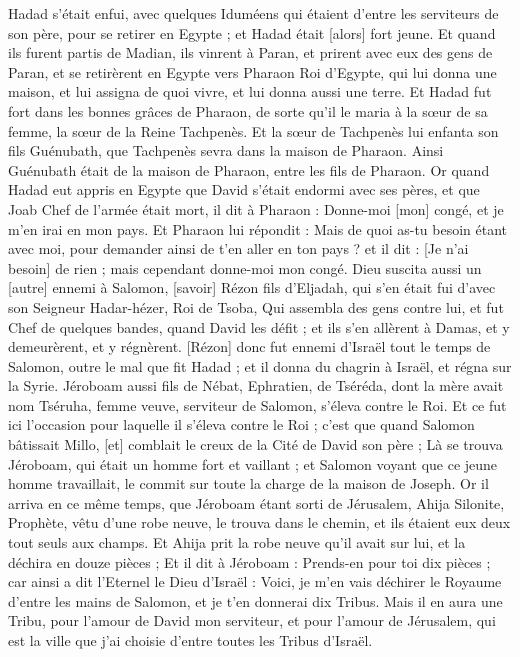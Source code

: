 \begin{multicols}{2}
Hadad s'était enfui, avec quelques Iduméens qui étaient d'entre les serviteurs de son père, pour se retirer en Egypte ; et Hadad était [alors] fort jeune.
Et quand ils furent partis de Madian, ils vinrent à Paran, et prirent avec eux des gens de Paran, et se retirèrent en Egypte vers Pharaon Roi d'Egypte, qui lui donna une maison, et lui assigna de quoi vivre, et lui donna aussi une terre.
Et Hadad fut fort dans les bonnes grâces de Pharaon, de sorte qu'il le maria à la sœur de sa femme, la sœur de la Reine Tachpenès.
Et la sœur de Tachpenès lui enfanta son fils Guénubath, que Tachpenès sevra dans la maison de Pharaon. Ainsi Guénubath était de la maison de Pharaon, entre les fils de Pharaon.
Or quand Hadad eut appris en Egypte que David s'était endormi avec ses pères, et que Joab Chef de l'armée était mort, il dit à Pharaon : Donne-moi [mon] congé, et je m'en irai en mon pays.
Et Pharaon lui répondit : Mais de quoi as-tu besoin étant avec moi, pour demander ainsi de t'en aller en ton pays ? et il dit : [Je n'ai besoin] de rien ; mais cependant donne-moi mon congé.
Dieu suscita aussi un [autre] ennemi à Salomon, [savoir] Rézon fils d'Eljadah, qui s'en était fui d'avec son Seigneur Hadar-hézer, Roi de Tsoba,
Qui assembla des gens contre lui, et fut Chef de quelques bandes, quand David les défit ; et ils s'en allèrent à Damas, et y demeurèrent, et y régnèrent.
[Rézon] donc fut ennemi d'Israël tout le temps de Salomon, outre le mal que fit Hadad ; et il donna du chagrin à Israël, et régna sur la Syrie.
Jéroboam aussi fils de Nébat, Ephratien, de Tséréda, dont la mère avait nom Tséruha, femme veuve, serviteur de Salomon, s'éleva contre le Roi.
Et ce fut ici l'occasion pour laquelle il s'éleva contre le Roi ; c'est que quand Salomon bâtissait Millo, [et] comblait le creux de la Cité de David son père ;
Là se trouva Jéroboam, qui était un homme fort et vaillant ; et Salomon voyant que ce jeune homme travaillait, le commit sur toute la charge de la maison de Joseph.
Or il arriva en ce même temps, que Jéroboam étant sorti de Jérusalem, Ahija Silonite, Prophète, vêtu d'une robe neuve, le trouva dans le chemin, et ils étaient eux deux tout seuls aux champs.
Et Ahija prit la robe neuve qu'il avait sur lui, et la déchira en douze pièces ;
Et il dit à Jéroboam : Prends-en pour toi dix pièces ; car ainsi a dit l'Eternel le Dieu d'Israël : Voici, je m'en vais déchirer le Royaume d'entre les mains de Salomon, et je t'en donnerai dix Tribus.
Mais il en aura une Tribu, pour l'amour de David mon serviteur, et pour l'amour de Jérusalem, qui est la ville que j'ai choisie d'entre toutes les Tribus d'Israël.

\end{multicols}
